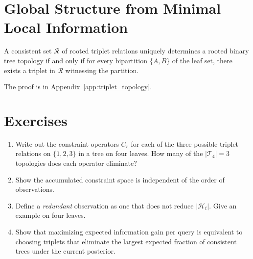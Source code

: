 \section{Global Structure from Minimal Local Information}

\begin{theorem}
\label{thm:constraint_convergence}
A consistent set $\mathcal{R}$ of rooted triplet relations uniquely determines a rooted binary tree topology if and only if for every bipartition $\{A,B\}$ of the leaf set, there exists a triplet in $\mathcal{R}$ witnessing the partition.
\end{theorem}

The proof is in Appendix~\ref{app:triplet_topology}.

\section{Exercises}

\begin{enumerate}
  \item Write out the constraint operators $C_r$ for each of the three possible triplet relations on $\{1,2,3\}$ in a tree on four leaves. How many of the $|\mathcal{T}_4|=3$ topologies does each operator eliminate?
  \item Show the accumulated constraint space is independent of the order of observations.
  \item Define a \emph{redundant} observation as one that does not reduce $|\mathcal{H}_t|$. Give an example on four leaves.
  \item Show that maximizing expected information gain per query is equivalent to choosing triplets that eliminate the largest expected fraction of consistent trees under the current posterior.
\end{enumerate}
